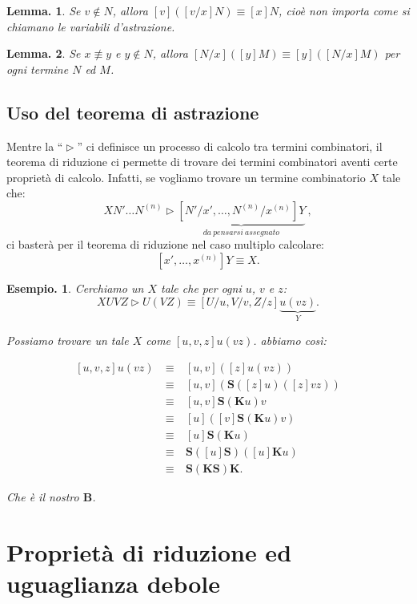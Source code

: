 \documentclass{book}
\newtheorem{lemma}{Lemma.}[chapter]
\newtheorem{esempio}{Esempio.}
\newcommand*{\kk}{\mathbf{K}}    %
\newcommand*{\sss}{\mathbf{S}}   %
\newcommand*{\bb}{\mathbf{B}}    %
\begin{document}
\begin{lemma}\label{Lc02n1}
Se $v \notin N$, allora $[v]([v/x]N) \equiv [x]N$, cio\`e non importa come si
chiamano le variabili d'astrazione.
\end{lemma}

\begin{lemma}\label{Lc02n2}
Se $x \not\equiv y$ e $y \notin N$, allora $[N/x]([y]M) \equiv [y]([N/x]M)$ 
per ogni termine $N$ ed $M$.
\end{lemma}


\subsection{Uso del teorema di astrazione}

Mentre la ``$\vartriangleright$'' ci definisce un processo di calcolo tra 
termini combinatori, il teorema di riduzione ci permette di trovare dei termini
combinatori aventi certe propriet\`a di calcolo. Infatti, se vogliamo trovare
un termine combinatorio $X$ tale che:
\[
XN' \ldots N^{(n)} \vartriangleright \underbrace{[N'/x', \ldots ,
N^{(n)}/x^{(n)}]Y}_{da\ pensarsi\ assegnato}\ ,
\]
ci baster\`a per il teorema di riduzione nel caso multiplo calcolare:
\[
[x', \ldots , x^{(n)}]Y \equiv X.
\]

\begin{esempio}Cerchiamo un $X$ tale che per ogni $u$, $v$ e $z$:
\[
XUVZ \vartriangleright U(VZ) \equiv [U/u, V/v, Z/z]\underbrace{u(vz)}_{Y}.
\]

Possiamo trovare un tale $X$ come $[u, v, z]u(vz)$. abbiamo cos\`i:

\[
\begin{array}{lcl}
[u,v,z]u(vz)\ & \equiv\ & [u,v]([z]u(vz)) \\ 
& \equiv & [u, v](\sss([z]u)([z]vz)) \\ 
& \equiv & [u,v]\sss(\kk u)v \\
& \equiv & [u]([v]\sss(\kk u)v) \\ 
& \equiv & [u]\sss(\kk u) \\ 
& \equiv & \sss([u]\sss)([u]\kk u) \\ 
& \equiv & \sss(\kk\sss)\kk .
\end{array}
\]

Che \`e il nostro $\bb$.
\end{esempio}

\section{Propriet\`a di riduzione ed uguaglianza debole}
\end{document}
